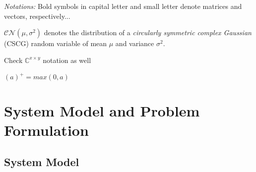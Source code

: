 \documentclass[lettersize,journal]{IEEEtran}
\begin{document}
\textit{Notations:} Bold symbols in capital letter and small letter denote matrices and vectors, respectively...



$\mathcal{CN}(\mu,\sigma^2)$ denotes the distribution of a \textit{circularly symmetric complex Gaussian} (CSCG) random variable of mean $\mu$ and variance $\sigma^2$.

Check $\mathbb{C}^{x\times y}$ notation as well

$(a)^{+} = max(0,a)$ 


\section{System Model and Problem Formulation}

\subsection{System Model}






\end{document}
